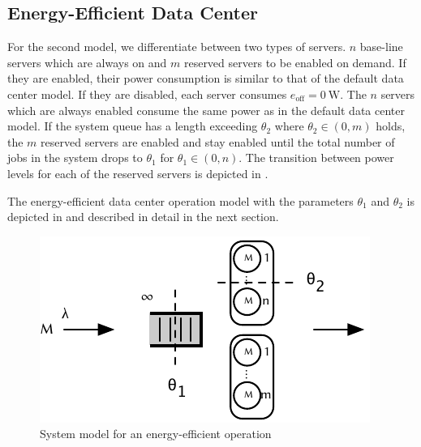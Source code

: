 \subsection{Energy-Efficient Data Center}\label{sec:probform_3states}
For the second model, we differentiate between two types of servers.
\(n\) base-line servers which are always on and \(m\) reserved servers to be enabled on demand.
If they are enabled, their power consumption is similar to that of the default data center model.
If they are disabled, each server consumes \(e_\text{off} = \SI{0}{\watt}\).
The \(n\) servers which are always enabled consume the same power as in the default data center model.
If the system queue has a length exceeding \(\theta_2\) where \(\theta_2 \in (0, m)\) holds, the \(m\) reserved servers are enabled and stay enabled until the total number of jobs in the system drops to \(\theta_1\) for \(\theta_1 \in (0, n)\).
The transition between power levels for each of the reserved servers is depicted in .

The energy-efficient data center operation model with the parameters \(\theta_1\) and \(\theta_2\) is depicted in  and described in detail in the next section.

\begin{figure}
  \centering
  \includegraphics{cloud/data_centers/problem_formulation/figures/model}
  \caption{System model for an energy-efficient operation}
  \label{fig:sec:cloud:data_centers:problem_formulation:model}
\end{figure}